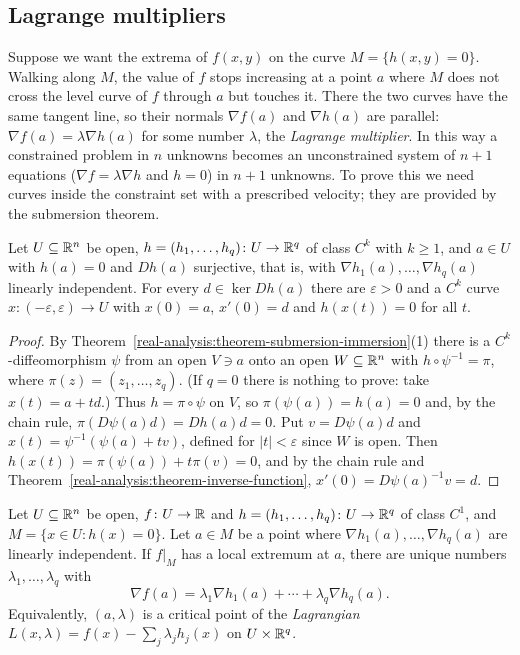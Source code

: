 \subsection{Lagrange multipliers}\label{real-analysis:subsection-lagrange}

Suppose we want the extrema of $f(x, y)$ on the curve $M = \{h(x, y) = 0\}$. Walking along $M$, the value of $f$ stops increasing at a point $a$ where $M$ does not cross the level curve of $f$
through $a$ but touches it. There the two curves have the same tangent line, so their normals $\nabla f(a)$ and $\nabla h(a)$ are parallel: $\nabla f(a) = \lambda\nabla h(a)$ for some number $\lambda$, the
\emph{Lagrange multiplier}. In this way a constrained problem in $n$ unknowns becomes an unconstrained system of $n + 1$ equations ($\nabla f = \lambda\nabla h$ and $h = 0$) in $n + 1$ unknowns. To prove
this we need curves inside the constraint set with a prescribed velocity; they are provided by the submersion theorem.

\begin{lemma}\label{real-analysis:lemma-curves-level-set}
Let $U \subseteq \mathbb{R}^n$ be open, $h = (h_1, \ldots, h_q) \colon U \to \mathbb{R}^q$ of class $C^k$ with $k \geq 1$, and $a \in U$ with $h(a) = 0$ and $Dh(a)$ surjective, that is, with $\nabla h_1(a), \ldots,
\nabla h_q(a)$ linearly independent. For every $d \in \ker Dh(a)$ there are $\varepsilon > 0$ and a $C^k$ curve $x \colon (-\varepsilon, \varepsilon) \to U$ with $x(0) = a$, $x'(0) = d$ and $h(x(t)) = 0$ for
all $t$.
\end{lemma}

\begin{proof}
By Theorem~\ref{real-analysis:theorem-submersion-immersion}(1) there is a $C^k$-diffeomorphism $\psi$ from an open $V \ni a$ onto an open $W \subseteq \mathbb{R}^n$ with $h \circ \psi^{-1} = \pi$, where
$\pi(z) = (z_1, \ldots, z_q)$. (If $q = 0$ there is nothing to prove: take $x(t) = a + td$.) Thus $h = \pi \circ \psi$ on $V$, so $\pi(\psi(a)) = h(a) = 0$ and, by the chain rule, $\pi(D\psi(a)d) =Dh(a)d = 0$.
Put $v = D\psi(a)d$ and $x(t) = \psi^{-1}(\psi(a) + tv)$, defined for $|t| < \varepsilon$ since $W$ is open. Then $h(x(t)) = \pi(\psi(a)) + t\pi(v) = 0$, and by the chain rule and
Theorem~\ref{real-analysis:theorem-inverse-function}, $x'(0) = D\psi(a)^{-1}v = d$.
\end{proof}

\begin{theorem}\label{real-analysis:theorem-lagrange}
Let $U \subseteq \mathbb{R}^n$ be open, $f \colon U \to \mathbb{R}$ and $h = (h_1, \ldots, h_q) \colon U \to \mathbb{R}^q$ of class $C^1$, and $M = \{x \in U : h(x) = 0\}$. Let $a \in M$ be a point where
$\nabla h_1(a), \ldots, \nabla h_q(a)$ are linearly independent. If $f|_M$ has a local extremum at $a$, there are unique numbers $\lambda_1, \ldots, \lambda_q$ with
\begin{equation}\label{real-analysis:equation-lagrange}
\nabla f(a) = \lambda_1\nabla h_1(a) + \cdots + \lambda_q\nabla h_q(a).
\end{equation}
Equivalently, $(a, \lambda)$ is a critical point of the \emph{Lagrangian} $L(x, \lambda) = f(x) - \sum_j\lambda_jh_j(x)$ on $U \times \mathbb{R}^q$.
\end{theorem}

